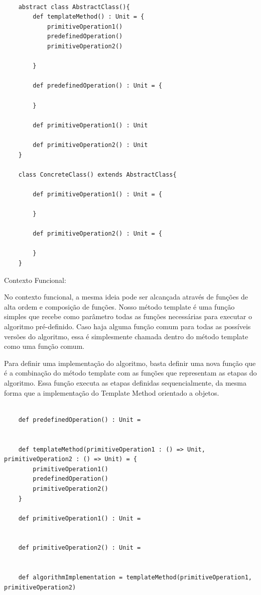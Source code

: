 \begin{lstlisting}[caption={Template Method Orientação a Objetos},label=ootpmethod]
    
    abstract class AbstractClass(){
        def templateMethod() : Unit = {
            primitiveOperation1()
            predefinedOperation()
            primitiveOperation2()

        }

        def predefinedOperation() : Unit = {
            
        }

        def primitiveOperation1() : Unit

        def primitiveOperation2() : Unit
    }

    class ConcreteClass() extends AbstractClass{
        
        def primitiveOperation1() : Unit = {
            
        }

        def primitiveOperation2() : Unit = {
            
        }
    }

\end{lstlisting}

Contexto Funcional:

No contexto funcional, a mesma ideia pode ser alcançada através de 
funções de alta ordem e composição de funções. Nosso método template 
é uma função simples que recebe como parâmetro todas as funções necessárias 
para executar o algoritmo pré-definido. Caso haja alguma função comum para 
todas as possíveis versões do algoritmo, essa é simplesmente chamada dentro 
do método template como uma função comum.

Para definir uma implementação do algoritmo, basta definir uma nova função 
que é a combinação do método template com as funções que representam as 
etapas do algoritmo. Essa função executa as etapas definidas sequencialmente, 
da mesma forma que a implementação do Template Method orientado a objetos.


\begin{lstlisting}[caption={Template Method Funcional},label=fptpmethod]
    
    def predefinedOperation() : Unit =
        

    def templateMethod(primitiveOperation1 : () => Unit, primitiveOperation2 : () => Unit) = {
        primitiveOperation1()
        predefinedOperation()
        primitiveOperation2()
    }

    def primitiveOperation1() : Unit = 
        

    def primitiveOperation2() : Unit = 
        
    
    def algorithmImplementation = templateMethod(primitiveOperation1, primitiveOperation2)


\end{lstlisting}

